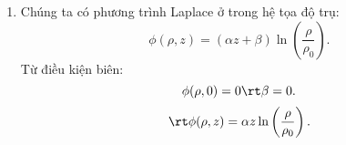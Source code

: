 \begin{loigiai}
  \begin{enumerate}[1)]
      \item Chúng ta có phương trình Laplace ở trong hệ tọa độ trụ:
  $$\phi (\rho, z) = (\alpha z +\beta)\ln  \left(\frac{\rho}{\rho_0}\right).$$
Từ điều kiện biên:
  $$\phi(\rho,0) = 0 \rt  \beta=0.$$
   $$\rt  \phi(\rho, z) = \alpha z \ln  \left(\frac{\rho}{\rho_0}\right).$$
        \begin{center}



\begin{tikzpicture}[x=0.75pt,y=0.75pt,yscale=-1,xscale=1]


\end{tikzpicture}
\end{center}
\end{enumerate}
\end{loigiai}
